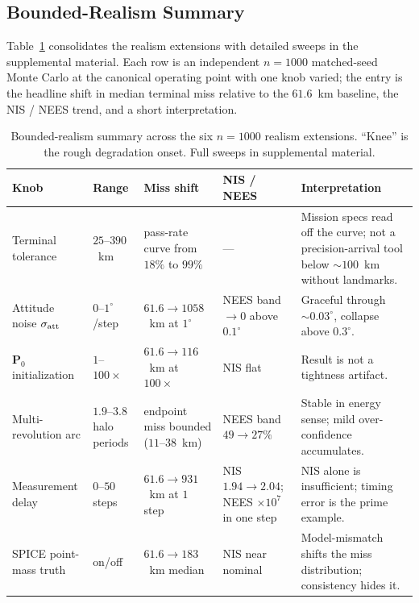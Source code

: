 \documentclass[10pt,twocolumn]{article}
\newcommand{\vect}[1]{\mathbf{#1}}
\begin{document}
\subsection{Bounded-Realism Summary}
\label{sec:results-realism}
Table~\ref{tab:realism-summary} consolidates the realism extensions with detailed sweeps in the supplemental material.  Each row is an independent $n=1000$ matched-seed Monte Carlo at the canonical operating point with one knob varied; the entry is the headline shift in median terminal miss relative to the $61.6$~km baseline, the NIS / NEES trend, and a short interpretation.

\begin{table}[t]
\centering
\caption{Bounded-realism summary across the six $n=1000$ realism extensions.  ``Knee'' is the rough degradation onset.  Full sweeps in supplemental material.}
\label{tab:realism-summary}
\footnotesize
\begin{tabular}{@{}p{}p{}p{}p{}p{}@{}}
\toprule
Knob & Range & Miss shift & NIS / NEES & Interpretation \\
\midrule
Terminal tolerance & $25$--$390$~km & pass-rate curve from $18\%$ to $99\%$ & --- & Mission specs read off the curve; not a precision-arrival tool below $\sim 100$~km without landmarks. \\
Attitude noise $\sigma_{\rm att}$ & $0$--$1^{\circ}$/step & $61.6\!\to\!1058$~km at $1^{\circ}$ & NEES band $\to 0$ above $0.1^{\circ}$ & Graceful through $\sim 0.03^{\circ}$, collapse above $0.3^{\circ}$. \\
$\vect{P}_0$ initialization & $1$--$100\times$ & $61.6\!\to\!116$~km at $100\times$ & NIS flat & Result is not a tightness artifact. \\
Multi-revolution arc & $1.9$--$3.8$ halo periods & endpoint miss bounded ($11$--$38$~km) & NEES band $49\!\to\!27\%$ & Stable in energy sense; mild over-confidence accumulates. \\
Measurement delay & $0$--$50$ steps & $61.6\!\to\!931$~km at $1$ step & NIS $1.94\!\to\!2.04$; NEES $\times 10^7$ in one step & NIS alone is insufficient; timing error is the prime example. \\
SPICE point-mass truth & on/off & $61.6\!\to\!183$~km median & NIS near nominal & Model-mismatch shifts the miss distribution; consistency hides it. \\
\bottomrule
\end{tabular}
\end{table}
\end{document}
